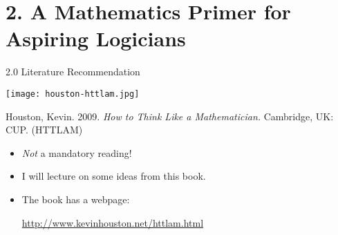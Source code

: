 \section{2. A Mathematics Primer for Aspiring Logicians}
\begin{frame}{2.0 Literature Recommendation}

	\begin{center}
		\texttt{[image: houston-httlam.jpg]}
	\end{center}

Houston, Kevin. 2009. \emph{How to Think Like a Mathematician.} Cambridge, UK: CUP. (HTTLAM)

\begin{itemize}

	\item \emph{Not} a mandatory reading!
	
	\item I will lecture on some ideas from this book.

	\item The book has a webpage:

	\begin{center}
	\url{http://www.kevinhouston.net/httlam.html}
	\end{center}
	
\end{itemize}

\end{frame}


